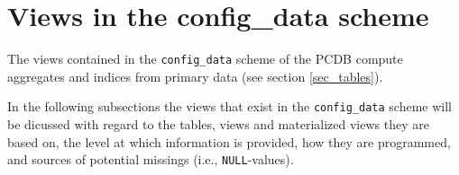 \section{Views in the config\_data scheme}\label{sec_views_in_config_data_scheme}
The views contained in the \texttt{\footnotesize config\_data} scheme of the PCDB compute aggregates and indices from primary data (see section \ref{sec_tables}).

In the following subsections the views that exist in the \texttt{\footnotesize config\_data} scheme will be dicussed with regard to the tables, views and materialized views they are based on, the level at which information is provided, how they are programmed, and sources of potential missings (i.e., \texttt{\footnotesize NULL}-values).


		
		
		

		
		
		
		

		

		
		
		
		
		
		
		

		
		
		
		
		

		
		

		
		

		
		

		

		
		
		